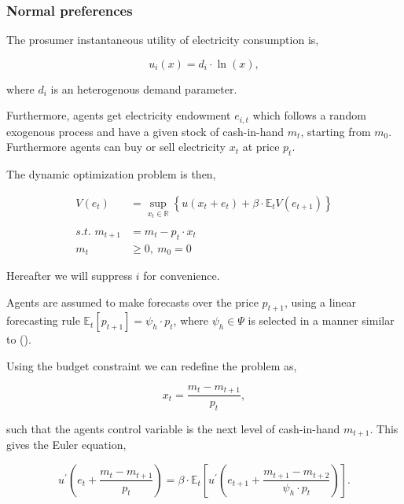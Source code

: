 \documentclass[american]{scrartcl}
\newcommand{\E}{\mathbb{E}}
\newcommand{\R}{\mathbb{R}}
\begin{document}
\subsubsection{Normal preferences}

The prosumer instantaneous utility of electricity consumption is,

\begin{equation*}
    u_i(x) = d_i \cdot \ln(x),
\end{equation*}

where $d_i$ is an heterogenous demand parameter.

Furthermore, agents get electricity endowment $e_{i, t}$ which follows a random exogenous process and have a given stock of cash-in-hand $m_t$, starting from $m_0$. Furthermore agents can buy or sell electricity $x_t$ at price $p_t$.

The dynamic optimization problem is then,

\begin{equation*}
    \begin{split}
        V(e_t) &= \sup_{x_t \in \R} \left\{u(x_t + e_t) + \beta \cdot \E_t V( e_{t+1} ) \right\} \\
        \\
        \textit{s.t. } m_{t+1} &= m_{t} - p_{t} \cdot x_{t}\\
        m_t  &\geq 0, \ m_0 = 0
    \end{split}
\end{equation*}

Hereafter we will suppress $i$ for convenience.

Agents are assumed to make forecasts over the price $p_{t+1}$, using a linear forecasting rule $\E_t[p_{t+1}] = \psi_h\cdot p_t$, where $\psi_h \in \Psi$ is selected in a manner similar to \citeauthor{Hommes2013} (\citeyear{Hommes2013}).

Using the budget constraint we can redefine the problem as,

\begin{equation}
    x_t = \frac{m_t - m_{t+1}}{p_t},
\end{equation}

such that the agents control variable is the next level of cash-in-hand $m_{t+1}$. This gives the Euler equation,

\begin{equation}
    u^\prime\left( e_t + \frac{m_t - m_{t+1}}{p_t} \right) = \beta \cdot \E_t \left[ u^\prime\left(e_{t+1} + \frac{m_{t+1} - m_{t+2}}{ \psi_h \cdot p_t} \right)  \right].
\end{equation}
\end{document}
